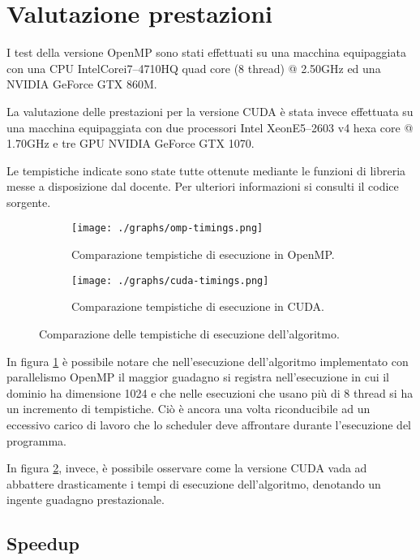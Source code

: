 \section{Valutazione prestazioni}

I test della versione OpenMP sono stati effettuati su una macchina equipaggiata
con una CPU Intel\textregistered\@ Core\texttrademark\@ i7--4710HQ quad core (8
thread) @ 2.50GHz ed una NVIDIA GeForce GTX 860M.

La valutazione delle prestazioni per la versione CUDA è stata invece effettuata
su una macchina equipaggiata con due processori Intel\textregistered\@
Xeon\textregistered\@ E5--2603 v4 hexa core @ 1.70GHz e tre GPU NVIDIA GeForce
GTX 1070.

Le tempistiche indicate sono state tutte ottenute mediante le funzioni di
libreria messe a disposizione dal docente. Per ulteriori informazioni si
consulti il codice sorgente.

\begin{figure}[!ht]
  \centering
  \begin{subfigure}[b]{0.49\linewidth}
  \centering
  \texttt{[image: ./graphs/omp-timings.png]}
  \caption{Comparazione tempistiche di esecuzione in
  OpenMP.}\label{fig:timingsomp1}
  \end{subfigure}
  \begin{subfigure}[b]{0.5\linewidth}
  \centering
  \texttt{[image: ./graphs/cuda-timings.png]}
  \caption{Comparazione tempistiche di esecuzione in
  CUDA.}\label{fig:timingscuda1}
  \end{subfigure}
  \caption{Comparazione delle tempistiche di esecuzione dell'algoritmo.}\label{fig:timings}
\end{figure}

In figura \ref{fig:timingsomp1} è possibile notare che nell'esecuzione
dell'algoritmo implementato con parallelismo OpenMP il maggior guadagno si
registra nell'esecuzione in cui il dominio ha dimensione 1024 e che nelle
esecuzioni che usano più di 8 thread si ha un incremento di tempistiche.
Ciò è ancora una volta riconducibile ad un eccessivo carico di lavoro che lo
scheduler deve affrontare durante l'esecuzione del programma.

In figura \ref{fig:timingscuda1}, invece, è possibile osservare come la versione
CUDA vada ad abbattere drasticamente i tempi di esecuzione dell'algoritmo,
denotando un ingente guadagno prestazionale.

\subsection{Speedup}

